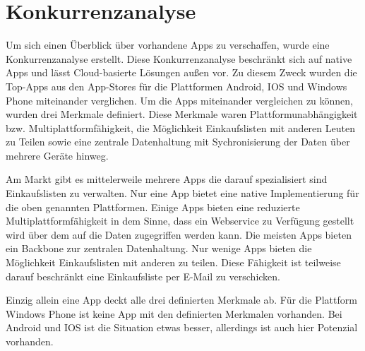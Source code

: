 \documentclass[10pt, conference, compsocconf]{IEEEtran}
\begin{document}
\section{Konkurrenzanalyse}
Um sich einen \"Uberblick \"uber vorhandene Apps zu verschaffen, wurde eine Konkurrenzanalyse erstellt.
Diese Konkurrenzanalyse beschr\"ankt sich auf native Apps und l\"asst Cloud-basierte L\"osungen au{\ss}en vor.
Zu diesem Zweck wurden die Top-Apps aus den App-Stores f\"ur die Plattformen Android, IOS und Windows Phone miteinander verglichen.
Um die Apps miteinander vergleichen zu k\"onnen, wurden drei Merkmale definiert. 
Diese Merkmale waren Plattformunabh\"angigkeit bzw. Multiplattformf\"ahigkeit, 
die M\"oglichkeit Einkaufslisten mit anderen Leuten zu Teilen sowie eine zentrale Datenhaltung mit Sychronisierung der Daten \"uber mehrere Ger\"ate hinweg.

Am Markt gibt es mittelerweile mehrere Apps die darauf spezialisiert sind Einkaufslisten zu verwalten.
Nur eine App bietet eine native Implementierung f\"ur die oben genannten Plattformen. Einige Apps bieten eine reduzierte Multiplattformf\"ahigkeit in dem Sinne, dass ein Webservice zu Verf\"ugung gestellt wird \"uber dem auf die Daten zugegriffen werden kann.
Die meisten Apps bieten ein Backbone zur zentralen Datenhaltung.
Nur wenige Apps bieten die M\"oglichkeit Einkaufslisten mit anderen zu teilen. Diese F\"ahigkeit ist teilweise darauf beschr\"ankt eine Einkaufsliste per E-Mail zu 
verschicken.

Einzig allein eine App deckt alle drei definierten Merkmale ab. 
F\"ur die Plattform Windows Phone ist keine App mit den definierten Merkmalen vorhanden.
Bei Android und IOS ist die Situation etwas besser, allerdings ist auch hier Potenzial vorhanden.
\end{document}
